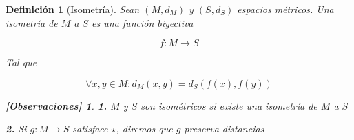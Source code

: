 \documentclass[oneside]{book} %
\theoremstyle{Teorema}
\newtheorem{Definicion}{Definición}[chapter]
\theoremstyle{Ejemplos}
\theoremstyle{[Obs]}
\newtheorem*{Obs}{[Observaciones]}
\renewcommand{\{}{\left\lbrace} %
\renewcommand{\}}{\right\rbrace} %
\begin{document}
			\begin{Definicion}[Isometría]\setlength{\parindent}{0em}
				
				Sean $(M, d_M)$ y $(S, d_S)$ espacios métricos. Una isometría de $M$ a $S$ es una función biyectiva 
				
				\[ f : M \to S \] 

				Tal que 

				\begin{equation}\tag{$\star$}
					\forall x, y \in M : d_M(x, y) = d_S(f(x), f(y))
				\end{equation}

				\begin{Obs}
				
					\textbf{1.} $M$ y $S$ son isométricos si existe una isometría de $M$ a $S$

					\textbf{2.} Si $g : M \to S$ satisface $\star$, diremos que $g$ preserva distancias 
				
				\end{Obs}

			\end{Definicion}
\end{document}

